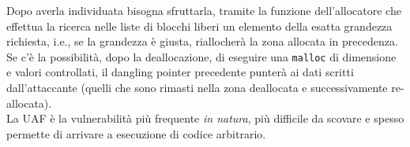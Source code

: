 Dopo averla individuata bisogna sfruttarla, tramite la funzione dell'allocatore che effettua la ricerca nelle liste di blocchi liberi un elemento della esatta grandezza richiesta, i.e., se la grandezza è giusta, riallocherà la zona allocata in precedenza.\\

Se c'è la possibilità, dopo la deallocazione, di eseguire una \texttt{malloc} di dimensione e valori controllati, il dangling pointer precedente punterà ai dati scritti dall'attaccante (quelli che sono rimasti nella zona deallocata e successivamente re-allocata). \\

La UAF è la vulnerabilità più frequente \textit{in natura}, più difficile da scovare e spesso permette di arrivare a esecuzione di codice arbitrario.\\

